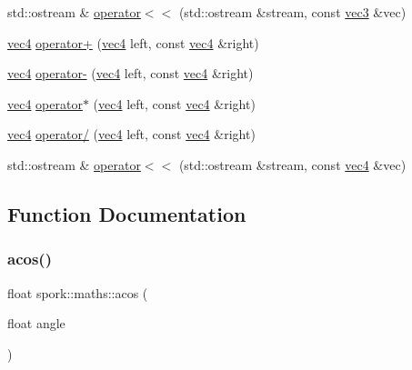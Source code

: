 \begin{DoxyCompactItemize}
\item 
std\+::ostream \& \hyperlink{namespacespork_1_1maths_a0f4b24ea725c7f2d1243b94c5a82cbf9}{operator$<$$<$} (std\+::ostream \&stream, const \hyperlink{structspork_1_1maths_1_1vec3}{vec3} \&vec)
\item 
\hyperlink{structspork_1_1maths_1_1vec4}{vec4} \hyperlink{namespacespork_1_1maths_a7bfe9cc91f2ee3e20fe59c44cb8a7dce}{operator+} (\hyperlink{structspork_1_1maths_1_1vec4}{vec4} left, const \hyperlink{structspork_1_1maths_1_1vec4}{vec4} \&right)
\item 
\hyperlink{structspork_1_1maths_1_1vec4}{vec4} \hyperlink{namespacespork_1_1maths_a6bde3edda69efd684ea41488335b6e30}{operator-\/} (\hyperlink{structspork_1_1maths_1_1vec4}{vec4} left, const \hyperlink{structspork_1_1maths_1_1vec4}{vec4} \&right)
\item 
\hyperlink{structspork_1_1maths_1_1vec4}{vec4} \hyperlink{namespacespork_1_1maths_a3bdcb7f8ce863a83804ecd9e2061de0d}{operator$\ast$} (\hyperlink{structspork_1_1maths_1_1vec4}{vec4} left, const \hyperlink{structspork_1_1maths_1_1vec4}{vec4} \&right)
\item 
\hyperlink{structspork_1_1maths_1_1vec4}{vec4} \hyperlink{namespacespork_1_1maths_a803106d6ee7cd5fc7d8d3a2fb0bd423f}{operator/} (\hyperlink{structspork_1_1maths_1_1vec4}{vec4} left, const \hyperlink{structspork_1_1maths_1_1vec4}{vec4} \&right)
\item 
std\+::ostream \& \hyperlink{namespacespork_1_1maths_a8cf0d7b0a5f64f0f6319f0b922eda679}{operator$<$$<$} (std\+::ostream \&stream, const \hyperlink{structspork_1_1maths_1_1vec4}{vec4} \&vec)
\end{DoxyCompactItemize}


\subsection{Function Documentation}
\mbox{\label{namespacespork_1_1maths_a9a93c40ad65249b72433c0b2d3502f7d}} 
\subsubsection{\texorpdfstring{acos()}{acos()}}
{\footnotesize\ttfamily float spork\+::maths\+::acos (\begin{DoxyParamCaption}\item[{float}]{angle }\end{DoxyParamCaption})\hspace{0.3cm}{\ttfamily [inline]}}



